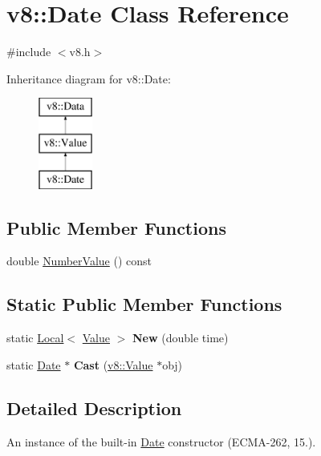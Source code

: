 \hypertarget{classv8_1_1_date}{}\section{v8\+:\+:Date Class Reference}
\label{classv8_1_1_date}


{\ttfamily \#include $<$v8.\+h$>$}

Inheritance diagram for v8\+:\+:Date\+:\begin{figure}[H]
\begin{center}
\leavevmode
\includegraphics[height=3.000000cm]{classv8_1_1_date}
\end{center}
\end{figure}
\subsection*{Public Member Functions}
\begin{DoxyCompactItemize}
\item 
double \hyperlink{classv8_1_1_date_a00ae69718a3810d82ae0b54b28d53512}{Number\+Value} () const 
\end{DoxyCompactItemize}
\subsection*{Static Public Member Functions}
\begin{DoxyCompactItemize}
\item 
\hypertarget{classv8_1_1_date_a137e2318408130a5321413a58f977615}{}static \hyperlink{classv8_1_1_local}{Local}$<$ \hyperlink{classv8_1_1_value}{Value} $>$ {\bfseries New} (double time)\label{classv8_1_1_date_a137e2318408130a5321413a58f977615}

\item 
\hypertarget{classv8_1_1_date_a59c8285b4a7bce7fe90b05abd07e2251}{}static \hyperlink{classv8_1_1_date}{Date} $\ast$ {\bfseries Cast} (\hyperlink{classv8_1_1_value}{v8\+::\+Value} $\ast$obj)\label{classv8_1_1_date_a59c8285b4a7bce7fe90b05abd07e2251}

\end{DoxyCompactItemize}


\subsection{Detailed Description}
An instance of the built-\/in \hyperlink{classv8_1_1_date}{Date} constructor (E\+C\+M\+A-\/262, 15.). 

